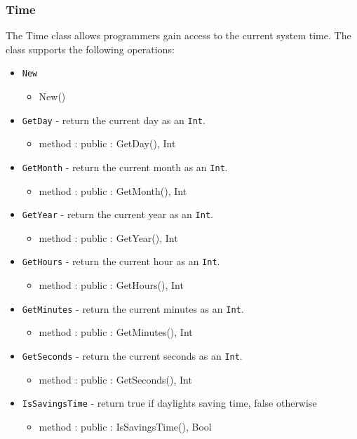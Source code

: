 \documentclass[12pt]{article}
\begin{document}
\subsubsection{Time}
The Time class allows programmers gain access to the current system time.    The class supports the following operations:
\begin{itemize}
\item \texttt{New}
  \begin{itemize}
  \item New()
  \end{itemize} 
\item \texttt{GetDay} - return the current day as an \texttt{Int}.
  \begin{itemize}
  \item method : public : GetDay(), Int
  \end{itemize}
\item \texttt{GetMonth} - return the current month as an \texttt{Int}.
  \begin{itemize}
  \item method : public : GetMonth(), Int
  \end{itemize}
\item \texttt{GetYear} - return the current year as an \texttt{Int}.
  \begin{itemize}
  \item method : public : GetYear(), Int
  \end{itemize}
\item \texttt{GetHours} - return the current hour as an \texttt{Int}.
  \begin{itemize}
  \item method : public : GetHours(), Int
  \end{itemize}
\item \texttt{GetMinutes} - return the current minutes as an \texttt{Int}.
  \begin{itemize}
  \item method : public : GetMinutes(), Int
  \end{itemize}
\item \texttt{GetSeconds} - return the current seconds as an \texttt{Int}.
  \begin{itemize}
  \item method : public : GetSeconds(), Int
  \end{itemize}
\item \texttt{IsSavingsTime} - return true if daylights saving time, false otherwise
  \begin{itemize}
  \item method : public : IsSavingsTime(), Bool
  \end{itemize}
\end{itemize}
\end{document}
